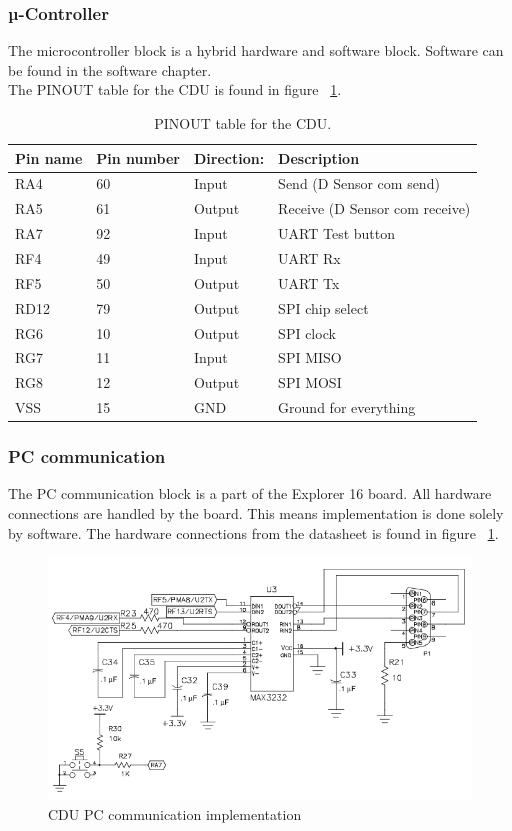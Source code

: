 \subsubsection{µ-Controller}
The microcontroller block is a hybrid hardware and software block. Software can be found in the software chapter.\\
The PINOUT table for the CDU is found in figure ~\ref{fig:PINOUT}.
\begin{table}[H]
	\centering
    \begin{tabular}{|l|l|l|l|}
    \hline
    Pin name & Pin number & Direction: & Description \\ \hline
    RA4    & 60 & Input          & Send (D Sensor com send)            \\ \hline
    RA5    & 61 & Output          & Receive (D Sensor com receive)    \\ \hline
    RA7	   & 92 & Input			 & UART Test button   \\ \hline
    RF4		& 49 & Input		 & UART Rx \\ \hline
    RF5		& 50 & Output		 & UART Tx \\ \hline
    RD12	& 79 & Output			 & SPI chip select           \\ \hline
    RG6		& 10 & Output			 & SPI clock           \\ \hline
    RG7		& 11 & Input			& SPI MISO		\\ \hline
    RG8		& 12 & Output			& SPI MOSI		\\ \hline
    VSS		& 15 & GND				& Ground for everything \\ \hline
    \end{tabular}
    \caption{PINOUT table for the CDU.}
    \label{fig:PINOUT}
\end{table}


\subsubsection{PC communication}
The PC communication block is a part of the Explorer 16 board. All hardware connections are handled by the board. This means implementation is done solely by software. The hardware connections from the datasheet is found in figure ~\ref{fig:CDUimppcc}.
\begin{figure}[H]
	\centering
	\includegraphics[width=1\textwidth]{billeder/imppcc}
	\caption{CDU PC communication implementation}
	\label{fig:CDUimppcc}
\end{figure}

